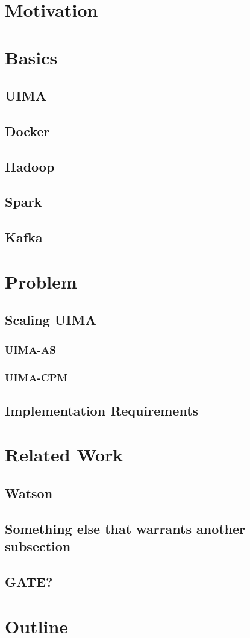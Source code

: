 \section{Motivation}

\section{Basics}



\subsection{UIMA}
\subsection{Docker}
\subsection{Hadoop}
\subsection{Spark}
\subsection{Kafka}

\section{Problem}
\subsection{Scaling UIMA}
\subsubsection{UIMA-AS}
\subsubsection{UIMA-CPM}
\subsection{Implementation Requirements}


\section{Related Work}

\subsection{Watson}

\subsection{Something else that warrants another subsection}

\subsection{GATE?}


\section{Outline}